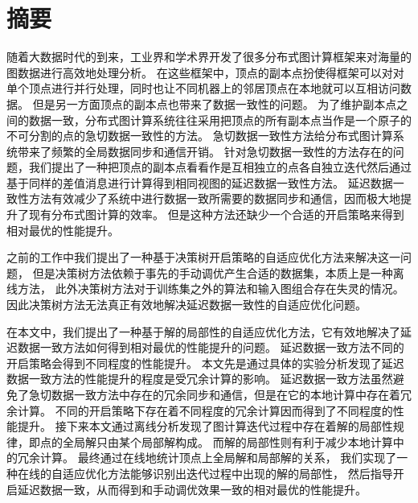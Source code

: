\maketitle%
\MAKETITLE%
\makedeclaration%
\intobmk\chapter*{摘\quad 要}%
\setcounter{page}{1}%


随着大数据时代的到来，工业界和学术界开发了很多分布式图计算框架来对海量的图数据进行高效地处理分析。
在这些框架中，顶点的副本点扮使得框架可以对对单个顶点进行并行处理，同时也让不同机器上的邻居顶点在本地就可以互相访问数据。
但是另一方面顶点的副本点也带来了数据一致性的问题。
为了维护副本点之间的数据一致，分布式图计算系统往往采用把顶点的所有副本点当作是一个原子的不可分割的点的急切数据一致性的方法。
急切数据一致性方法给分布式图计算系统带来了频繁的全局数据同步和通信开销。
针对急切数据一致性的方法存在的问题，我们提出了一种把顶点的副本点看看作是互相独立的点各自独立迭代然后通过基于同样的差值消息进行计算得到相同视图的延迟数据一致性方法。
延迟数据一致性方法有效减少了系统中进行数据一致所需要的数据同步和通信，因而极大地提升了现有分布式图计算的效率。
但是这种方法还缺少一个合适的开启策略来得到相对最优的性能提升。

之前的工作中我们提出了一种基于决策树开启策略的自适应优化方法来解决这一问题，
但是决策树方法依赖于事先的手动调优产生合适的数据集，本质上是一种离线方法，
此外决策树方法对于训练集之外的算法和输入图组合存在失灵的情况。
因此决策树方法无法真正有效地解决延迟数据一致性的自适应优化问题。

在本文中，我们提出了一种基于解的局部性的自适应优化方法，它有效地解决了延迟数据一致方法如何得到相对最优的性能提升的问题。
延迟数据一致方法不同的开启策略会得到不同程度的性能提升。
本文先是通过具体的实验分析发现了延迟数据一致方法的性能提升的程度是受冗余计算的影响。
延迟数据一致方法虽然避免了急切数据一致方法中存在的冗余同步和通信，但是在它的本地计算中存在着冗余计算。
不同的开启策略下存在着不同程度的冗余计算因而得到了不同程度的性能提升。
接下来本文通过离线分析发现了图计算迭代过程中存在着解的局部性规律，即点的全局解只由某个局部解构成。
而解的局部性则有利于减少本地计算中的冗余计算。
最终通过在线地统计顶点上全局解和局部解的关系，
我们实现了一种在线的自适应优化方法能够识别出迭代过程中出现的解的局部性，
然后指导开启延迟数据一致，从而得到和手动调优效果一致的相对最优的性能提升。

